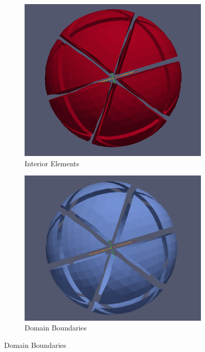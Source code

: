 \begin{figure}[H]
	\begin{subfigure}[b]{0.30\textwidth} \hspace{4mm} \includegraphics[scale=0.22]{images/32-inter} \captionsetup{width=0.8\textwidth} \caption{ Interior Elements } \end{subfigure}
	\begin{subfigure}[b]{0.30\textwidth} \hspace{4mm} \includegraphics[scale=0.18]{images/32-db}    \captionsetup{width=0.8\textwidth} \caption{ Domain Boundaries} \end{subfigure}

\end{figure}
